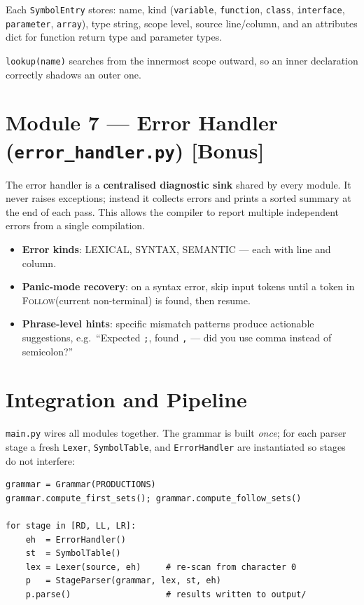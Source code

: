 \documentclass[12pt,a4paper]{article}
\begin{document}
Each \texttt{SymbolEntry} stores: name, kind (\texttt{variable}, \texttt{function},
\texttt{class}, \texttt{interface}, \texttt{parameter}, \texttt{array}), type
string, scope level, source line/column, and an attributes dict for function
return type and parameter types.

\texttt{lookup(name)} searches from the innermost scope outward, so an inner
declaration correctly shadows an outer one.

\section{Module 7 — Error Handler (\texttt{error\_handler.py}) \textnormal{\small[Bonus]}}

The error handler is a \textbf{centralised diagnostic sink} shared by every module.
It never raises exceptions; instead it collects errors and prints a sorted summary
at the end of each pass. This allows the compiler to report multiple independent
errors from a single compilation.

\begin{itemize}
  \item \textbf{Error kinds}: LEXICAL, SYNTAX, SEMANTIC — each with line and column.
  \item \textbf{Panic-mode recovery}: on a syntax error, skip input tokens until a
    token in \textsc{Follow}(current non-terminal) is found, then resume.
  \item \textbf{Phrase-level hints}: specific mismatch patterns produce actionable
    suggestions, e.g.\ ``Expected \texttt{;}, found \texttt{,} — did you use comma
    instead of semicolon?''
\end{itemize}

\section{Integration and Pipeline}

\texttt{main.py} wires all modules together. The grammar is built \emph{once};
for each parser stage a fresh \texttt{Lexer}, \texttt{SymbolTable}, and
\texttt{ErrorHandler} are instantiated so stages do not interfere:

\begin{lstlisting}
grammar = Grammar(PRODUCTIONS)
grammar.compute_first_sets(); grammar.compute_follow_sets()

for stage in [RD, LL, LR]:
    eh  = ErrorHandler()
    st  = SymbolTable()
    lex = Lexer(source, eh)     # re-scan from character 0
    p   = StageParser(grammar, lex, st, eh)
    p.parse()                   # results written to output/
\end{lstlisting}
\end{document}

